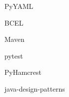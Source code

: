 \begin{thebibliography}{1}
\begin{flushleft}
PyYAML
\end{flushleft}

\begin{flushleft}
BCEL
\end{flushleft}

\begin{flushleft}
Maven
\end{flushleft}

\begin{flushleft}
pytest
\end{flushleft}

\begin{flushleft}
PyHamcrest
\end{flushleft}

\begin{flushleft}
java-design-patterns
\end{flushleft}

\end{thebibliography}
